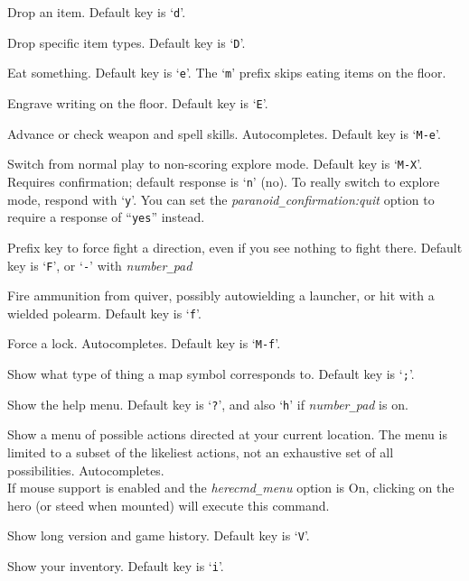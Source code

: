 Drop an item. Default key is `{\tt d}'.
\item[\tb{\#droptype}]
Drop specific item types. Default key is `{\tt D}'.
\item[\tb{\#eat}]
Eat something. Default key is `{\tt e}'.
The `{\tt m}' prefix skips eating items on the floor.
\item[\tb{\#engrave}]
Engrave writing on the floor. Default key is `{\tt E}'.
\item[\tb{\#enhance}]
Advance or check weapon and spell skills. Autocompletes.
Default key is `{\tt M-e}'.
\item[\tb{\#exploremode}]
Switch from normal play to non-scoring explore mode.
Default key is `{\tt M-X}'.\\
Requires confirmation; default response is `{\tt n}' (no).
To really switch to explore mode, respond with `{\tt y}'.
You can set the
{\it paranoid\verb+_+confirmation:quit\/}
option to require a response of ``{\tt yes}'' instead.
\item[\tb{\#fight}]
Prefix key to force fight a direction, even if you see nothing
to fight there.
Default key is `{\tt F}', or `{\tt -}' with
{\it number\verb+_+pad\/}
\item[\tb{\#fire}]
Fire ammunition from quiver, possibly autowielding a launcher,
or hit with a wielded polearm.
Default key is `{\tt f}'.
\item[\tb{\#force}]
Force a lock. Autocompletes. Default key is `{\tt M-f}'.
\item[\tb{\#glance}]
Show what type of thing a map symbol corresponds to. Default key is `{\tt ;}'.
\item[\tb{\#help}]
Show the help menu.
Default key is `{\tt ?}',
and also `{\tt h}' if {\it number\verb+_+pad\/} is on.
\item[\tb{\#herecmdmenu}]
Show a menu of possible actions directed at your current location.
The menu is limited to a subset of the likeliest actions, not an
exhaustive set of all possibilities.
Autocompletes.\\
If mouse support is enabled and the {\it herecmd\verb+_+menu\/}
option is On, clicking on the hero (or steed when mounted) will
execute this command.
\item[\tb{\#history}]
Show long version and game history. Default key is `{\tt V}'.
\item[\tb{\#inventory}]
Show your inventory. Default key is `{\tt i}'.
\item[\tb{\#inventtype}]
